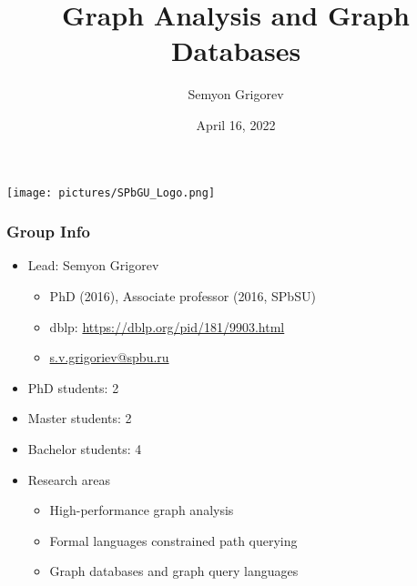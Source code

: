 \documentclass[xcolor=table,aspectratio=169]{beamer}
\title[Graph analysis \& Graph DB]{Graph Analysis and Graph Databases}
\institute[PL\&T@SPbSU]{
Saint Petersburg State University
}
\author[Semyon Grigorev]{Semyon Grigorev}
\date{April 16, 2022}
\begin{document}
{
\begin{frame}[fragile]
  \begin{table}
  \centering
  \texttt{[image: pictures/SPbGU\_Logo.png]}
  \end{table}
  \titlepage
\end{frame}
}

\begin{frame}[fragile]
  \frametitle{Group Info}  
  \begin{itemize}      
      \item Lead: Semyon Grigorev
      \begin{itemize}
        \item PhD (2016), Associate professor (2016, SPbSU)
        \item dblp: \href{https://dblp.org/pid/181/9903.html}{https://dblp.org/pid/181/9903.html}
        \item \href{s.v.grigoriev@spbu.ru}{s.v.grigoriev@spbu.ru}
      \end{itemize}
      \item PhD students: 2
      \item Master students: 2
      \item Bachelor students: 4
      \pause
      \item Research areas
      \begin{itemize}
        \item High-performance graph analysis        
        \item Formal languages constrained path querying  
        \item Graph databases and graph query languages      
      \end{itemize}
    \end{itemize}
\end{frame}
\end{document}
